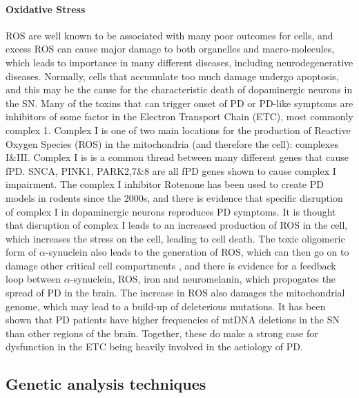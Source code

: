 \documentclass{article}
\begin{document}
\paragraph{Oxidative Stress}
ROS are well known to be associated with many poor outcomes for cells, and excess ROS can cause major damage to both organelles and macro-molecules, which leads to importance in many different diseases, including neurodegenerative diseases\cite{Brieger2012ReactiveDisease}. Normally, cells that accumulate too much damage undergo apoptosis, and this may be the cause for the characteristic death of dopaminergic neurons in the SN\cite{Subramaniam2013MitochondrialDisease}. Many of the toxins that can trigger onset of PD or PD-like symptoms are inhibitors of some factor in the Electron Transport Chain (ETC), most commonly complex 1\cite{Subramaniam2013MitochondrialDisease}.
Complex I is one of two main locations for the production of Reactive Oxygen Species (ROS) in the mitochondria (and therefore the cell): complexes I\&III\cite{Murphy2009HowSpecies}. Complex I is is a common thread between many different genes that cause fPD. SNCA, PINK1, PARK2,7\&8 are all fPD genes shown to cause complex I impairment\cite{Subramaniam2013MitochondrialDisease}. The complex I inhibitor Rotenone has been used to create PD models in rodents since the 2000s\cite{Betarbet2000ChronicDisease}, and there is evidence that specific disruption of complex I in dopaminergic neurons reproduces PD symptoms\cite{Gonzalez-Rodriguez2021DisruptionParkinsonism}. It is thought that disruption of complex I leads to an increased production of ROS in the cell, which increases the stress on the cell, leading to cell death\cite{Subramaniam2013MitochondrialDisease}.
The toxic oligomeric form of $\alpha$-synuclein also leads to the generation of ROS, which can then go on to damage other critical cell compartments \cite{Choi2022PathologicalToxicity}, and there is evidence for a feedback loop between $\alpha$-synuclein, ROS, iron and neuromelanin, which propogates the spread of PD in the brain\cite{JansenvanRensburg2021ToxicTurmeric}.
The increase in ROS also damages the mitochondrial genome, which may lead to a build-up of deleterious mutations. It has been shown that PD patients have higher frequencies of mtDNA deletions in the SN than other regions of the brain\cite{Bender2006HighDisease}.
Together, these do make a strong case for dysfunction in the ETC being heavily involved in the aetiology of PD.
\subsection{Genetic analysis techniques}
\end{document}
